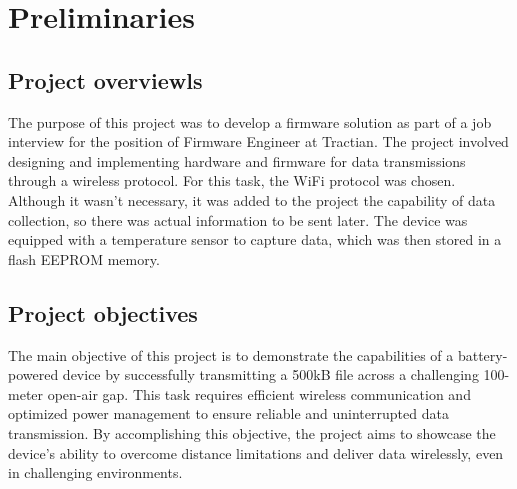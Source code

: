\newpage

\section*{Preliminaries}\label{00Sec:Preliminaries}

\renewcommand{\thesubsection}{\roman{subsection}}
\subsection{Project overviewls}\label{01Sub:ProjectOverview}

The purpose of this project was to develop a firmware solution as part of a job interview for the 
position of Firmware Engineer at Tractian. The project involved designing and implementing hardware
and firmware for data transmissions through a wireless protocol. For this task, the WiFi protocol was
chosen. Although it wasn't necessary, it was added to the project the capability of data collection, so there was
actual information to be sent later. The device was equipped with a temperature sensor to capture data, which was then
stored in a flash EEPROM memory.


\subsection{Project objectives}\label{01Sub:ProjectObjectives}


The main objective of this project is to demonstrate the capabilities of a battery-powered device by successfully
transmitting a 500kB file across a challenging 100-meter open-air gap. This task requires efficient wireless communication
and optimized power management to ensure reliable and uninterrupted data transmission. By accomplishing this objective,
the project aims to showcase the device's ability to overcome distance limitations and deliver data wirelessly, even in challenging
environments.





\renewcommand{\thesubsection}{\arabic{subsection}}


